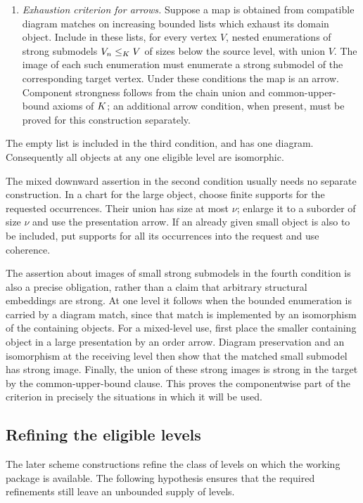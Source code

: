 \begin{definition}
\begin{enumerate}
\item \emph{Exhaustion criterion for arrows.}
Suppose a map is obtained from compatible diagram matches on increasing
bounded lists which exhaust its domain object.  Include in these lists,
for every vertex $V$, nested enumerations of strong submodels
$V_n\leq_K V$ of sizes below the source level, with union $V$.
The image of each such enumeration must enumerate a strong submodel
of the corresponding target vertex.  Under these conditions the map
is an arrow.  Component strongness follows from the chain union and
common-upper-bound axioms of $K$; an additional arrow condition, when
present, must be proved for this construction separately.
\end{enumerate}
The empty list is included in the third condition, and has one
diagram.  Consequently all objects at any one eligible level are
isomorphic.
\end{definition}

The mixed downward assertion in the second condition usually needs no
separate construction.  In a chart for the large object, choose finite
supports for the requested occurrences.  Their union has size at most
$\nu$; enlarge it to a suborder of size $\nu$ and use the presentation
arrow.  If an already given small object is also to be included, put
supports for all its occurrences into the request and use coherence.

The assertion about images of small strong submodels in the fourth
condition is also a precise obligation, rather than a claim that
arbitrary structural embeddings are strong.  At one level it follows
when the bounded enumeration is carried by a diagram match, since that
match is implemented by an isomorphism of the containing objects.
For a mixed-level use, first place the smaller containing object in a
large presentation by an order arrow.  Diagram preservation and an
isomorphism at the receiving level then show that the matched small
submodel has strong image.  Finally, the union of these strong images
is strong in the target by the common-upper-bound clause.  This proves
the componentwise part of the criterion in precisely the situations
in which it will be used.

\subsection{Refining the eligible levels}
\label{lev:refining-levels}

The later scheme constructions refine the class of levels on which the working
package is available. The following hypothesis ensures that the required
refinements still leave an unbounded supply of levels.

